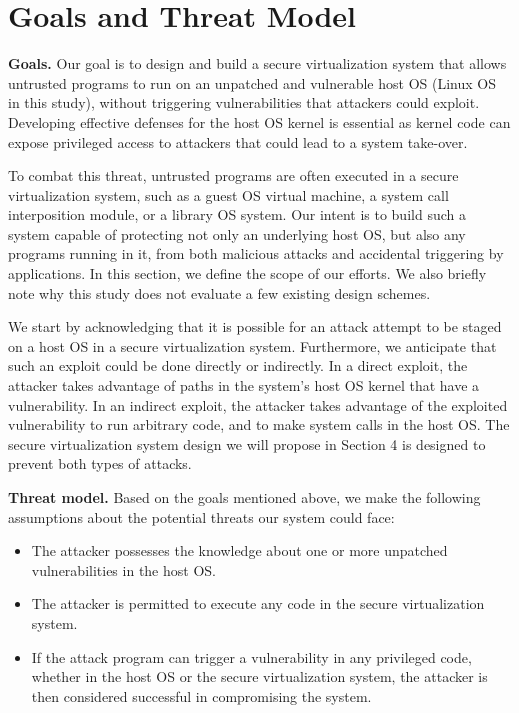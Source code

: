 \section{Goals and Threat Model}
\label{sec.motivation-and-background}

\textbf{Goals.}
Our goal is to design and build a secure virtualization system that allows
untrusted programs to run on an unpatched and vulnerable host OS (Linux OS in
this study), without triggering vulnerabilities that attackers could exploit.
Developing effective defenses for the host OS kernel is essential as kernel code
can expose privileged access to attackers that could lead to a system take-over.

To combat this threat, untrusted programs are often executed in a 
secure virtualization system, such as a guest OS virtual machine, a system call 
interposition module, or a library OS system. Our intent is to
build such a system capable of protecting not only
an underlying host OS, but also any programs running in it, from both 
malicious attacks
and accidental triggering by applications.  
In this section, we define the scope of our efforts. We also briefly note why 
this study does not evaluate a few existing design schemes.

We start by acknowledging that it is possible for an attack attempt to be staged
on a host OS in a secure virtualization system.
Furthermore, we anticipate that such an exploit could be done directly or indirectly.
In a direct exploit, the attacker
takes advantage of paths in the system's host OS kernel
that have a vulnerability. In an indirect exploit,
the attacker takes advantage of the exploited vulnerability to run arbitrary code, and
to make system calls in the host OS.
The secure virtualization system design we will propose
in Section 4 is designed to prevent both types of attacks.

\noindent
\textbf{Threat model.}
Based on the goals mentioned above, we make the following assumptions about the
potential threats our system could face:

\begin{itemize}\setlength\itemsep{0em}

\item The attacker possesses the knowledge about one or more unpatched 
vulnerabilities in the host OS.

\item The attacker is permitted to execute any code in the secure 
virtualization system.

\item If the attack program can trigger a vulnerability in any privileged 
code, whether in the host OS or the secure virtualization system, the attacker 
is then considered successful in compromising the system.

\end{itemize}

